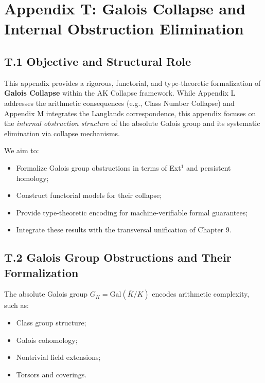\documentclass[11pt]{article}
\begin{document}

\section*{Appendix T: Galois Collapse and Internal Obstruction Elimination}

\subsection*{T.1 Objective and Structural Role}

This appendix provides a rigorous, functorial, and type-theoretic formalization of \textbf{Galois Collapse} within the AK Collapse framework. While Appendix L addresses the arithmetic consequences (e.g., Class Number Collapse) and Appendix M integrates the Langlands correspondence, this appendix focuses on the \emph{internal obstruction structure} of the absolute Galois group and its systematic elimination via collapse mechanisms.

We aim to:
\begin{itemize}
    \item Formalize Galois group obstructions in terms of Ext$^1$ and persistent homology;
    \item Construct functorial models for their collapse;
    \item Provide type-theoretic encoding for machine-verifiable formal guarantees;
    \item Integrate these results with the transversal unification of Chapter 9.
\end{itemize}

\subsection*{T.2 Galois Group Obstructions and Their Formalization}

The absolute Galois group $G_K = \mathrm{Gal}(\overline{K}/K)$ encodes arithmetic complexity, such as:

\begin{itemize}
    \item Class group structure;
    \item Galois cohomology;
    \item Nontrivial field extensions;
    \item Torsors and coverings.
\end{itemize}
\end{document}
